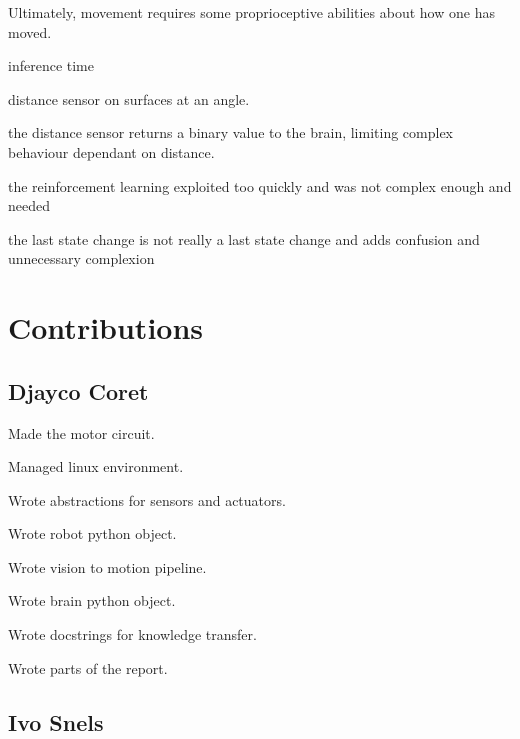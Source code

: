 \documentclass[conference]{IEEEtran}
\begin{document}
Ultimately, movement requires some proprioceptive abilities about how one has moved.


inference time

distance sensor on surfaces at an angle.

the distance sensor returns a binary value to the brain, limiting complex behaviour dependant on distance.

the reinforcement learning exploited too quickly and was not complex enough and needed 

the last state change is not really a last state change and adds confusion and unnecessary complexion 

\section{Contributions}

\subsection{Djayco Coret}
Made the motor circuit.

Managed linux environment.

Wrote abstractions for sensors and actuators.

Wrote robot python object.

Wrote vision to motion pipeline.

Wrote brain python object.

Wrote docstrings for knowledge transfer.

Wrote parts of the report.


\subsection{Ivo Snels}




\end{document}
